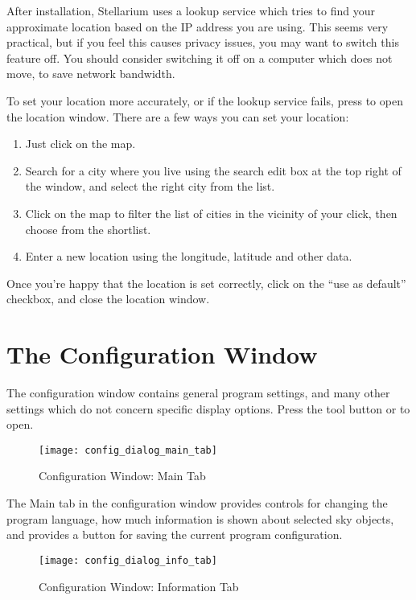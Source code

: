 After installation, Stellarium uses a lookup service which tries to
find your approximate location based on the IP address you are
using. This seems very practical, but if you feel this causes privacy
issues, you may want to switch this feature off. You should consider
switching it off on a computer which does not move, to save network
bandwidth.

To set your location more accurately, or if the lookup service fails,
press  to open the location window. There are a few ways you
can set your location:

\begin{enumerate}
\item Just click on the map.
\item Search for a city where you live using the search edit box at
  the top right of the window, and select the right city from the
  list.
\item Click on the map to filter the list of cities in the vicinity of
  your click, then choose from the shortlist.
\item Enter a new location using the longitude, latitude and other
  data.
\end{enumerate}

Once you're happy that the location is set correctly, click on the ``use
as default'' checkbox, and close the location window.



\section{The Configuration Window}
\label{sec:gui:configuration}

The configuration window contains general program settings, and many
other settings which do not concern specific display options. Press
the tool button or  to open.

\begin{figure}[h]
\centering\texttt{[image: config\_dialog\_main\_tab]}
\caption{Configuration Window: Main Tab}
\label{fig:gui:configuration:main}
\end{figure}

The Main tab in the configuration window provides controls for changing
the program language, how much information is shown about selected sky
objects, and provides a button for saving the current program
configuration.

\begin{figure}[h]
\centering\texttt{[image: config\_dialog\_info\_tab]}
\caption{Configuration Window: Information Tab}
\label{fig:gui:configuration:info}
\end{figure}


